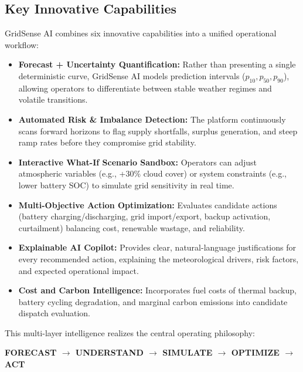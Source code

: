 \subsection{Key Innovative Capabilities}
\label{subsec:innovative_capabilities}

GridSense AI combines six innovative capabilities into a unified operational workflow:
\begin{itemize}[leftmargin=1.5em, itemsep=0.35em]
    \item \textbf{Forecast + Uncertainty Quantification:} Rather than presenting a single deterministic curve, GridSense AI models prediction intervals ($p_{10}, p_{50}, p_{90}$), allowing operators to differentiate between stable weather regimes and volatile transitions.
    \item \textbf{Automated Risk \& Imbalance Detection:} The platform continuously scans forward horizons to flag supply shortfalls, surplus generation, and steep ramp rates before they compromise grid stability.
    \item \textbf{Interactive What-If Scenario Sandbox:} Operators can adjust atmospheric variables (e.g., +30\% cloud cover) or system constraints (e.g., lower battery SOC) to simulate grid sensitivity in real time.
    \item \textbf{Multi-Objective Action Optimization:} Evaluates candidate actions (battery charging/discharging, grid import/export, backup activation, curtailment) balancing cost, renewable wastage, and reliability.
    \item \textbf{Explainable AI Copilot:} Provides clear, natural-language justifications for every recommended action, explaining the meteorological drivers, risk factors, and expected operational impact.
    \item \textbf{Cost and Carbon Intelligence:} Incorporates fuel costs of thermal backup, battery cycling degradation, and marginal carbon emissions into candidate dispatch evaluation.
\end{itemize}

This multi-layer intelligence realizes the central operating philosophy:
\begin{center}
    \textbf{\color{primaryNavy}FORECAST $\longrightarrow$ UNDERSTAND $\longrightarrow$ SIMULATE $\longrightarrow$ OPTIMIZE $\longrightarrow$ ACT}
\end{center}
